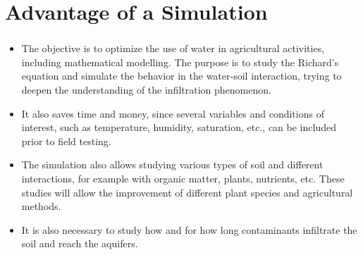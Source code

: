 \section{Advantage of a Simulation}
\begin{frame}
	\frametitle{\secname}
		\begin{itemize}
			\item The objective is to optimize the use of water in 
			agricultural activities, including mathematical modelling. 
			The purpose is to study the Richard's equation and simulate 
			the behavior in the water-soil interaction, trying to deepen 
			the understanding of the infiltration phenomenon.
			\item It also saves time and money, since several variables 
			and conditions of interest, such as temperature, humidity, 
			saturation, etc., can be included prior to field testing.
			\item The simulation also allows studying various types of 
			soil and different interactions, for example with organic 
			matter, plants, nutrients, etc. These studies will allow the 
			improvement of different plant species and agricultural methods.
			\item It is also necessary to study how and for how long 
			contaminants infiltrate the soil and reach the aquifers.
		\end{itemize}
\end{frame}
